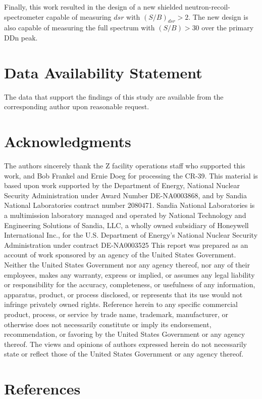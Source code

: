 Finally, this work resulted in the design of a new shielded neutron-recoil-spectrometer capable of measuring $dsr$ with $(S/B)_{dsr} > 2$. The new design is also capable of measuring the full spectrum with $(S/B) > 30$ over the primary DDn peak.  

\section*{Data Availability Statement}

The data that support the findings of this study are available from the corresponding author upon reasonable request.

\section*{Acknowledgments}

The authors sincerely thank the Z facility operations staff who supported this work, and Bob Frankel and Ernie Doeg for processing the CR-39. This material is based upon work supported by the Department of Energy, National Nuclear Security Administration under Award Number DE-NA0003868, and by Sandia National Laboratories contract number 2080471. Sandia National Laboratories is a multimission laboratory managed and operated by National Technology and Engineering Solutions of Sandia, LLC, a wholly owned subsidiary of Honeywell International Inc., for the U.S. Department of Energy's National Nuclear Security Administration under contract DE-NA0003525 This report was prepared as an account of work sponsored by an agency of the United States Government. Neither the United States Government nor any agency thereof, nor any of their employees, makes any warranty, express or implied, or assumes any legal liability or responsibility for the accuracy, completeness, or usefulness of any information, apparatus, product, or process disclosed, or represents that its use would not infringe privately owned rights.  Reference herein to any specific commercial product, process, or service by trade name, trademark, manufacturer, or otherwise does not necessarily constitute or imply its endorsement, recommendation, or favoring by the United States Government or any agency thereof. The views and opinions of authors expressed herein do not necessarily state or reflect those of the United States Government or any agency thereof.
\section*{References}	
